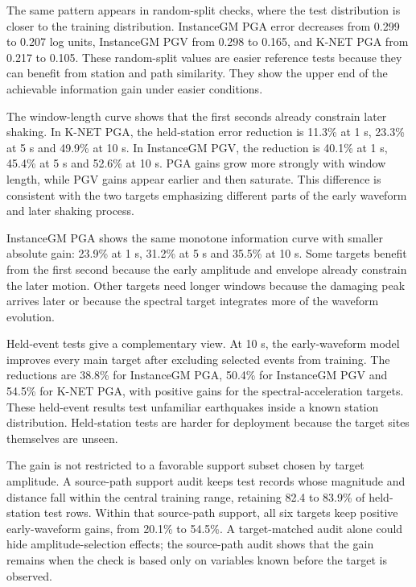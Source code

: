 \documentclass[
  10pt,
]{article}
\begin{document}
The same pattern appears in random-split checks, where the test
distribution is closer to the training distribution. InstanceGM PGA
error decreases from 0.299 to 0.207 log units, InstanceGM PGV from 0.298
to 0.165, and K-NET PGA from 0.217 to 0.105. These random-split values
are easier reference tests because they can benefit from station and
path similarity. They show the upper end of the achievable information
gain under easier conditions.

The window-length curve shows that the first seconds already constrain
later shaking. In K-NET PGA, the held-station error reduction is 11.3\%
at 1 s, 23.3\% at 5 s and 49.9\% at 10 s. In InstanceGM PGV, the
reduction is 40.1\% at 1 s, 45.4\% at 5 s and 52.6\% at 10 s. PGA gains
grow more strongly with window length, while PGV gains appear earlier
and then saturate. This difference is consistent with the two targets
emphasizing different parts of the early waveform and later shaking
process.

InstanceGM PGA shows the same monotone information curve with smaller
absolute gain: 23.9\% at 1 s, 31.2\% at 5 s and 35.5\% at 10 s. Some
targets benefit from the first second because the early amplitude and
envelope already constrain the later motion. Other targets need longer
windows because the damaging peak arrives later or because the spectral
target integrates more of the waveform evolution.

Held-event tests give a complementary view. At 10 s, the early-waveform
model improves every main target after excluding selected events from
training. The reductions are 38.8\% for InstanceGM PGA, 50.4\% for
InstanceGM PGV and 54.5\% for K-NET PGA, with positive gains for the
spectral-acceleration targets. These held-event results test unfamiliar
earthquakes inside a known station distribution. Held-station tests are
harder for deployment because the target sites themselves are unseen.

The gain is not restricted to a favorable support subset chosen by
target amplitude. A source-path support audit keeps test records whose
magnitude and distance fall within the central training range, retaining
82.4 to 83.9\% of held-station test rows. Within that source-path
support, all six targets keep positive early-waveform gains, from 20.1\%
to 54.5\%. A target-matched audit alone could hide amplitude-selection
effects; the source-path audit shows that the gain remains when the
check is based only on variables known before the target is observed.
\end{document}
